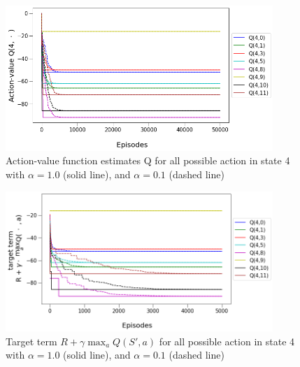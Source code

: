 \begin{figure}[hbt!]
    \centering
    \includegraphics[width=0.9\textwidth]{figures/Reinforcement/Q4.png}
    \caption{Action-value function estimates Q for all possible action in state 4 with $\alpha = 1.0$ (solid line), and $\alpha = 0.1$ (dashed line)}
    \label{fig:Q4 convergence}
\end{figure}

\begin{figure}[hbt!]
    \centering
    \includegraphics[width=0.9\textwidth]{figures/Reinforcement/targetQ4.png}
    \caption{Target term $R + \gamma \max_a Q(S', a)$ for all possible action in state 4 with $\alpha = 1.0$ (solid line), and $\alpha = 0.1$ (dashed line)}
    \label{fig:Q4 target}
\end{figure}

